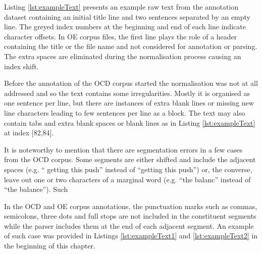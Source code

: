     Listing \ref{lst:exampleText} presents an example raw text from the annotation dataset containing an initial title line and two sentences separated by an empty line. The greyed index numbers at the beginning and end of each line indicate character offsets. In OE corpus files, the first line plays the role of a header containing the title or the file name and not considered for annotation or parsing. The extra spaces are eliminated during the normalisation process causing an index shift. 
    
    Before the annotation of the OCD corpus started the normalisation was not at all addressed and so the text contains some irregularities. Mostly it is organised as one sentence per line, but there are instances of extra blank lines or missing new line characters leading to few sentences per line as a block. The text may also contain tabs and extra blank spaces or blank lines as in Listing \ref{lst:exampleText} at index [82,84]. 

    It is noteworthy to mention that there are segmentation errors in a few cases from the OCD corpus. Some segments are either shifted and include the adjacent spaces (e.g. `` getting this push'' instead of ``getting this push'') or, the converse, leave out one or two characters of a marginal word (e.g. ``the balanc'' instead of ``the balance''). Such 


    In the OCD and OE corpus annotations, the punctuation marks such as commas, semicolons, three dots and full stops are not included in the constituent segments while the parser includes them at the end of each adjacent segment. An example of such case was provided in Listings \ref{lst:exampleText1} and \ref{lst:exampleText2} in the beginning of this chapter. 
    
